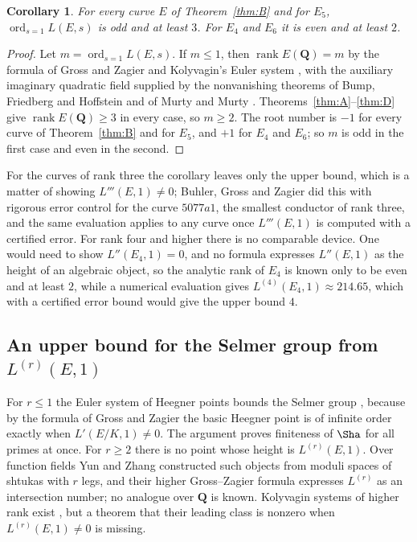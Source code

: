 \documentclass[11pt]{amsart}
\newtheorem{corollary}[theorem]{Corollary}
\theoremstyle{definition}
\newcommand{\Q}{\mathbf{Q}}
\newcommand{\rk}{\operatorname{rank}}
\newcommand{\ord}{\operatorname{ord}}
\begin{document}
\begin{corollary}\label{cor:analytic}
For every curve $E$ of Theorem~\ref{thm:B} and for $E_5$, $\ord_{s=1}L(E,s)$ is odd and at least $3$. For $E_4$ and $E_6$ it is even and at least $2$.
\end{corollary}

\begin{proof}
Let $m=\ord_{s=1}L(E,s)$. If $m\le1$, then $\rk E(\Q)=m$ by the formula of Gross and Zagier \cite{GZ86} and Kolyvagin's Euler system \cite{Kol90}, with the auxiliary imaginary quadratic field supplied by the nonvanishing theorems of Bump, Friedberg and Hoffstein \cite{BFH90} and of Murty and Murty \cite{MM91}. Theorems~\ref{thm:A}--\ref{thm:D} give $\rk E(\Q)\ge3$ in every case, so $m\ge2$. The root number is $-1$ for every curve of Theorem~\ref{thm:B} and for $E_5$, and $+1$ for $E_4$ and $E_6$; so $m$ is odd in the first case and even in the second.
\end{proof}

For the curves of rank three the corollary leaves only the upper bound, which is a matter of showing $L'''(E,1)\ne0$; Buhler, Gross and Zagier \cite{BGZ85} did this with rigorous error control for the curve $5077a1$, the smallest conductor of rank three, and the same evaluation applies to any curve once $L'''(E,1)$ is computed with a certified error. For rank four and higher there is no comparable device. One would need to show $L''(E_4,1)=0$, and no formula expresses $L''(E,1)$ as the height of an algebraic object, so the analytic rank of $E_4$ is known only to be even and at least $2$, while a numerical evaluation gives $L^{(4)}(E_4,1)\approx214.65$, which with a certified error bound would give the upper bound $4$.

\subsection{An upper bound for the Selmer group from \texorpdfstring{$L^{(r)}(E,1)$}{the r-th derivative}}
For $r\le1$ the Euler system of Heegner points bounds the Selmer group \cite{Kol90}, because by the formula of Gross and Zagier the basic Heegner point is of infinite order exactly when $L'(E/K,1)\ne0$. The argument proves finiteness of $\Sha$ for all primes at once. For $r\ge2$ there is no point whose height is $L^{(r)}(E,1)$. Over function fields Yun and Zhang \cite{YZ17} constructed such objects from moduli spaces of shtukas with $r$ legs, and their higher Gross--Zagier formula expresses $L^{(r)}$ as an intersection number; no analogue over $\Q$ is known. Kolyvagin systems of higher rank exist \cite{MR04}, but a theorem that their leading class is nonzero when $L^{(r)}(E,1)\neq0$ is missing.
\end{document}
